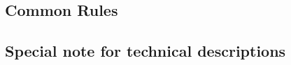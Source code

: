 \documentclass[twoside,a4paper]{refart}
\begin{document}
\subsection{Common Rules}
\label{design}



\subsection{Special note for technical descriptions}





%


\printindex
\end{document}
